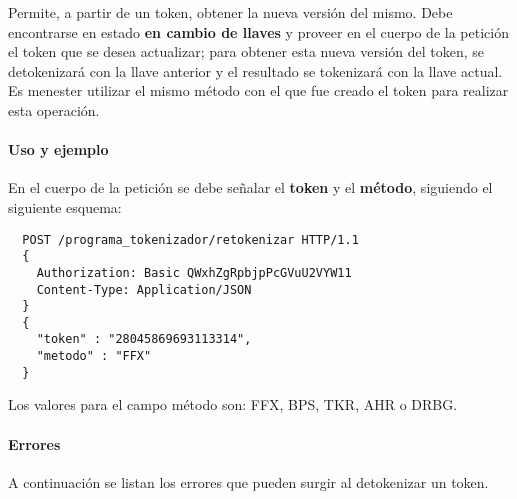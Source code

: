 Permite, a partir de un token, obtener la nueva versión del mismo.
Debe encontrarse en estado \textbf{en cambio de llaves} y proveer en el cuerpo
de la petición el token que se desea actualizar; para obtener esta nueva
versión del token, se detokenizará con la llave anterior y el resultado
se tokenizará con la llave actual. Es menester utilizar el mismo método con
el que fue creado el token para realizar esta operación.

\paragraph{Uso y ejemplo}

En el cuerpo de la petición se debe señalar el \textbf{token} y el
\textbf{método}, siguiendo el siguiente esquema:

\begin{verbatim}
  POST /programa_tokenizador/retokenizar HTTP/1.1
  {
    Authorization: Basic QWxhZgRpbjpPcGVuU2VYW11
    Content-Type: Application/JSON
  }
  {
    "token" : "28045869693113314",
    "metodo" : "FFX"
  }
\end{verbatim}

Los valores para el campo método son: FFX, BPS, TKR, AHR o DRBG.

\paragraph{Errores}

A continuación se listan los errores que pueden surgir al detokenizar un
token.


